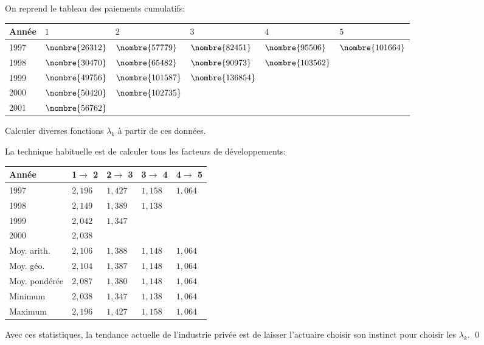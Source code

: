\begin{exemple}
  On reprend le tableau des paiements cumulatifs:
  \begin{center}
    \begin{tabular}{|l|l l l l l|}\hline
      Année & $1$ & $2$ & $3$ & $4$ & $5$  \\ \hline
      1997 &$\nombre{26312}$&	$\nombre{57779}$&	$\nombre{82451}$&	$\nombre{95506}$&	$\nombre{101664}$\\
      1998 &$\nombre{30470}$&	$\nombre{65482}$&	$\nombre{90973}$&	$\nombre{103562}$&	\\
      1999 &$\nombre{49756}$&	$\nombre{101587}$&	$\nombre{136854}$&	&	\\
      2000 &$\nombre{50420}$&	$\nombre{102735}$&	& &	\\
      2001 &$\nombre{56762}$&	&&&\\ \hline
    \end{tabular}
  \end{center}
  Calculer diverses fonctions $\lambda_k$ à partir de ces données.

  La technique habituelle est de calculer tous les facteurs de
  développements:
  \begin{center}
    \begin{tabular}{|l|l l l l|}\hline
      Année & 1$\rightarrow$ 2 &  2$\rightarrow$ 3 &  3$\rightarrow$ 4 &  4$\rightarrow$ 5   \\ \hline
      1997 &$2,196$&$1,427$&$1,158$&$1,064$\\
      1998 &$2,149$&$1,389$&$1,138$&\\
      1999 &$2,042$&$1,347$&	&	\\
      2000 &$2,038$&	 &	&\\ \hline \hline
      Moy. arith. &$2,106$&$1,388$&$1,148$&$1,064$ \\
      Moy. géo. &$2,104$&$1,387$&$1,148$&$1,064$ \\
      Moy. pondérée &$2,087$&$1,380$&$1,148$&$1,064$ \\
      Minimum  &$2,038$&$1,347$&$1,138$&$1,064$ \\
      Maximum &$2,196$&$1,427$&$1,158$&$1,064$ \\ \hline
    \end{tabular}
  \end{center}
  Avec ces statistiques, la tendance actuelle de l'industrie privée
  est de laisser l'actuaire choisir son instinct pour choisir les
  $\lambda_k$. %
  \qed
\end{exemple}


